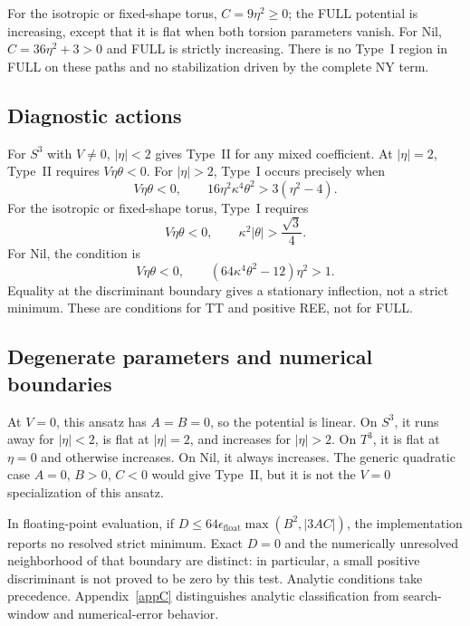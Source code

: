 For the isotropic or fixed-shape torus, $C=9\eta^2\ge0$;
the FULL potential is increasing, except that it is flat when both
torsion parameters vanish. For Nil, $C=36\eta^2+3>0$ and FULL is
strictly increasing. There is no Type~I region in FULL on these paths
and no stabilization driven by the complete NY term.

\subsection{Diagnostic actions}
For $S^3$ with $V\ne0$, $|\eta|<2$ gives Type~II for any mixed coefficient.
At $|\eta|=2$, Type~II requires $V\eta\theta<0$.
For $|\eta|>2$, Type~I occurs precisely when
\begin{equation}
V\eta\theta<0,\qquad
16\eta^2\kappa^4\theta^2>3(\eta^2-4).
\tag{M4-03}\label{eq:M4-03}
\end{equation}
For the isotropic or fixed-shape torus, Type~I requires
\begin{equation}
V\eta\theta<0,\qquad
\kappa^2\lvert\theta\rvert>\frac{\sqrt3}{4}.
\tag{M4-04}\label{eq:M4-04}
\end{equation}
For Nil, the condition is
\begin{equation}
V\eta\theta<0,\qquad
(64\kappa^4\theta^2-12)\eta^2>1.
\tag{M4-05}\label{eq:M4-05}
\end{equation}
Equality at the discriminant boundary gives a stationary inflection,
not a strict minimum. These are conditions for TT and positive REE,
not for FULL.

\subsection{Degenerate parameters and numerical boundaries}
At $V=0$, this ansatz has $A=B=0$, so the potential is linear.
On $S^3$, it runs away for $|\eta|<2$, is flat at $|\eta|=2$, and
increases for $|\eta|>2$.
On $T^3$, it is flat at $\eta=0$ and otherwise increases.
On Nil, it always increases.
The generic quadratic case $A=0$, $B>0$, $C<0$ would give Type~II,
but it is not the $V=0$ specialization of this ansatz.

In floating-point evaluation, if
$D\le64\epsilon_{\mathrm{float}}\max(B^2,|3AC|)$,
the implementation reports no resolved strict minimum.
Exact $D=0$ and the numerically unresolved neighborhood of that boundary
are distinct: in particular, a small positive discriminant is not proved
to be zero by this test. Analytic conditions take precedence.
Appendix~\ref{appC} distinguishes analytic classification from
search-window and numerical-error behavior.

